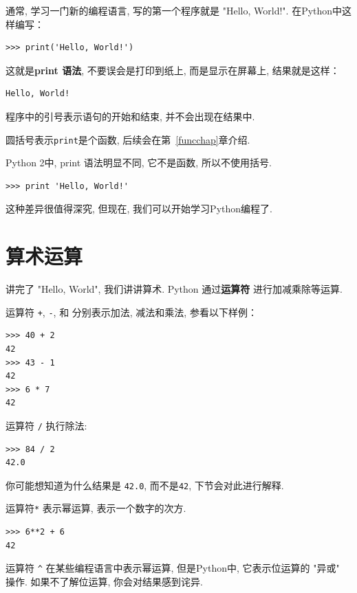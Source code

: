 \documentclass[10pt]{book}
\begin{document}
通常, 学习一门新的编程语言, 写的第一个程序就是 "Hello, World!". 
在Python中这样编写：

\begin{verbatim}
>>> print('Hello, World!')
\end{verbatim}
%

这就是{\bf print 语法}, 不要误会是打印到纸上, 而是显示在屏幕上, 
结果就是这样：

\begin{verbatim}
Hello, World!
\end{verbatim}
%

程序中的引号表示语句的开始和结束, 并不会出现在结果中. 

圆括号表示{\tt print}是个函数, 后续会在第~\ref{funcchap}章介绍. 
 

Python 2中, print 语法明显不同, 它不是函数, 所以不使用括号. 

\begin{verbatim}
>>> print 'Hello, World!'
\end{verbatim}
%
这种差异很值得深究, 
但现在, 我们可以开始学习Python编程了. 


\section{算术运算}

讲完了 "Hello, World", 我们讲讲算术. Python 通过{\bf 运算符} 
进行加减乘除等运算. 

运算符 {\tt +}, {\tt -}, 和 {\tt *} 分别表示加法, 减法和乘法, 参看以下样例：

\begin{verbatim}
>>> 40 + 2
42
>>> 43 - 1
42
>>> 6 * 7
42
\end{verbatim}
%
运算符 {\tt /} 执行除法:

\begin{verbatim}
>>> 84 / 2
42.0
\end{verbatim}
%

你可能想知道为什么结果是 {\tt 42.0}, 而不是{\tt 42}, 下节会对此进行解释. 

运算符{\tt **} 表示幂运算, 表示一个数字的次方. 

\begin{verbatim}
>>> 6**2 + 6
42
\end{verbatim}
%

运算符 \verb"^" 在某些编程语言中表示幂运算, 但是Python中, 
它表示位运算的 "异或" 操作. 如果不了解位运算, 你会对结果感到诧异. 
\end{document}
